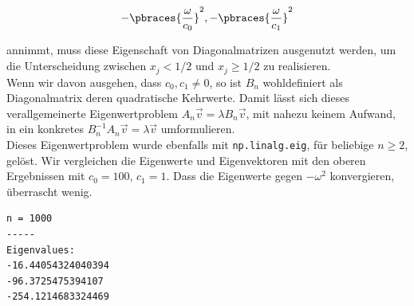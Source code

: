 \begin{align*}
  -\pbraces{\frac{\omega}{c_0}}^2, -\pbraces{\frac{\omega}{c_1}}^2
\end{align*}

annimmt, muss diese Eigenschaft von Diagonalmatrizen ausgenutzt werden, um die Unterscheidung zwischen $x_j < 1/2$ und $x_j \geq 1/2$ zu realisieren. \\

Wenn wir davon ausgehen, dass $c_0, c_1 \neq 0$, so ist $B_n$ wohldefiniert als Diagonalmatrix deren quadratische Kehrwerte. Damit lässt sich dieses verallgemeinerte Eigenwertproblem $A_n \vec v = \lambda B_n \vec v$, mit nahezu keinem Aufwand, in ein konkretes $B_n^{-1} A_n \vec v = \lambda \vec v$ umformulieren. \\

Dieses Eigenwertproblem wurde ebenfalls mit \verb|np.linalg.eig|, für beliebige $n \geq 2$, gelöst. Wir vergleichen die Eigenwerte und Eigenvektoren mit den oberen  Ergebnissen mit $c_0 = 100$, $c_1 = 1$. Dass die Eigenwerte gegen $-\omega^2$ konvergieren, überrascht wenig. \\

\begin{verbatim}
n = 1000
-----
Eigenvalues:
-16.44054324040394
-96.3725475394107
-254.1214683324469
\end{verbatim}
